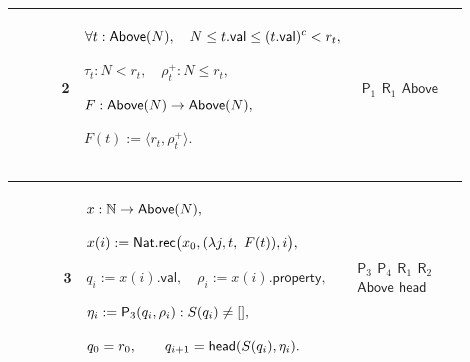\documentclass[12pt,reqno]{amsart}
\theoremstyle{blueplain}
\numberwithin{equation}{section}
\begin{document}
{\scriptsize \setlength{\parskip}{0pt}\nointerlineskip
\noindent 
\begin{tabular}{|@{}>{\centering\arraybackslash}m{0.10658\linewidth}|>{\centering\arraybackslash}m{0.03553\linewidth}|>{\centering\arraybackslash}m{0.52105\linewidth}|>{\centering\arraybackslash}m{0.23684\linewidth}|}
\hline
{\hypertarget{row:R2}{$\mathsf{R}$}} & {2} & {$\displaystyle \forall t: 
\hyperlink{def:Above}{\mathsf{Above} }(N),\quad N\le t.\mathsf{val}\le(t.%
\mathsf{val})^c<r_t,$ \par$\displaystyle \tau_t:N<r_t,\quad\rho^{+}_t:N\le
r_t,$ \par$\displaystyle F:\hyperlink{def:Above}{\mathsf{Above} }(N)\to 
\hyperlink{def:Above}{\mathsf{Above} }(N),$ \par$\displaystyle F(t):=\langle
r_t,\rho^{+}_t\rangle.$} & {\hyperlink{row:P1}{$\mathsf{P}_{1}$} \hyperlink{row:R1}%
{$\mathsf{R}_{1}$} \hyperlink{def:Above}{$\mathsf{Above}$}} \\ \hline
\end{tabular}
}

{\scriptsize \setlength{\parskip}{0pt}\nointerlineskip
\noindent 
\begin{tabular}{|@{}>{\centering\arraybackslash}m{0.10658\linewidth}|>{\centering\arraybackslash}m{0.03553\linewidth}|>{\centering\arraybackslash}m{0.52105\linewidth}|>{\centering\arraybackslash}m{0.23684\linewidth}|}
\hline
{\hypertarget{row:R3}{$\mathsf{R}$}} & {3} & {$\displaystyle x:\mathbb{N}\to 
\hyperlink{def:Above}{\mathsf{Above} }(N),$ \par$\displaystyle x(i):=\mathsf{%
Nat.rec}\bigl(x_0,(\lambda j,t,\ F(t)),i\bigr),$ \par$\displaystyle %
q_i:=x(i).\mathsf{val},\quad\rho_i:=x(i).\mathsf{property},$ \par$%
\displaystyle \eta_i:=\hyperlink{row:P3}{\mathsf{P}_{3} }(q_i,\rho_i):S(q_i)%
\ne[],$ \par$\displaystyle q_0=r_0,\qquad q_{i+1}=\hyperlink{def:head}{%
\mathsf{head} }(S(q_i),\eta_i).$} & {\hyperlink{row:P3}{$\mathsf{P}_{3}$} 
\hyperlink{row:P4}{$\mathsf{P}_{4}$} \hyperlink{row:R1}{$\mathsf{R}_{1}$} 
\hyperlink{row:R2}{$\mathsf{R}_{2}$} \hyperlink{def:Above}{$\mathsf{Above}$} 
\hyperlink{def:head}{$\mathsf{head}$}} \\ \hline
\end{tabular}
}
\end{document}
